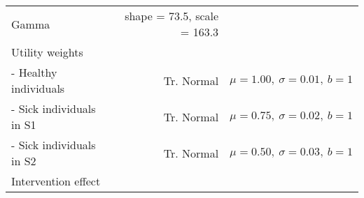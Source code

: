 \documentclass[]{article}
\begin{document}
\begin{longtable}[]{@{}lrr@{}}
\begin{minipage}[t]{0.17\columnwidth}
Gamma\strut
\end{minipage} & \begin{minipage}[t]{0.42\columnwidth}\raggedleft\strut
shape = 73.5, scale = 163.3\strut
\end{minipage}\tabularnewline
\begin{minipage}[t]{0.32\columnwidth}\raggedright\strut
Utility weights\strut
\end{minipage} & \begin{minipage}[t]{0.17\columnwidth}\raggedleft\strut
\strut
\end{minipage} & \begin{minipage}[t]{0.42\columnwidth}\raggedleft\strut
\strut
\end{minipage}\tabularnewline
\begin{minipage}[t]{0.32\columnwidth}\raggedright\strut
- Healthy individuals\strut
\end{minipage} & \begin{minipage}[t]{0.17\columnwidth}\raggedleft\strut
Tr. Normal\strut
\end{minipage} & \begin{minipage}[t]{0.42\columnwidth}\raggedleft\strut
\(\mu = 1.00, \ \sigma = 0.01, \ b = 1\)\strut
\end{minipage}\tabularnewline
\begin{minipage}[t]{0.32\columnwidth}\raggedright\strut
- Sick individuals in S1\strut
\end{minipage} & \begin{minipage}[t]{0.17\columnwidth}\raggedleft\strut
Tr. Normal\strut
\end{minipage} & \begin{minipage}[t]{0.42\columnwidth}\raggedleft\strut
\(\mu = 0.75, \ \sigma = 0.02, \ b = 1\)\strut
\end{minipage}\tabularnewline
\begin{minipage}[t]{0.32\columnwidth}\raggedright\strut
- Sick individuals in S2\strut
\end{minipage} & \begin{minipage}[t]{0.17\columnwidth}\raggedleft\strut
Tr. Normal\strut
\end{minipage} & \begin{minipage}[t]{0.42\columnwidth}\raggedleft\strut
\(\mu = 0.50, \ \sigma = 0.03, \ b = 1\)\strut
\end{minipage}\tabularnewline
\begin{minipage}[t]{0.32\columnwidth}\raggedright\strut
Intervention effect\strut
\end{minipage} & \begin{minipage}[t]{0.17\columnwidth}\raggedleft\strut

\end{minipage}
\end{longtable}
\end{document}
